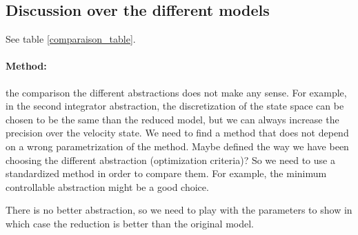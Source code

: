 \subsection{Discussion over the different models}
See table \ref{comparaison_table}.

\paragraph{Method:}
the comparison the different abstractions does not make any sense.
For example, in the second integrator abstraction, the discretization of the state space can be chosen to be the same than the reduced model, but we can always increase the precision over the velocity state.
We need to find a method that does not depend on a wrong parametrization of the method. Maybe defined the way we have been choosing the different abstraction (optimization criteria)?
So we need to use a standardized method in order to compare them.
For example, the minimum controllable abstraction might be a good choice.

There is no better abstraction, so we need to play with the parameters to show in which case the reduction is better than the original model.


